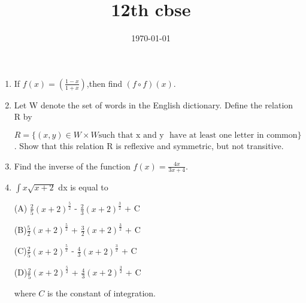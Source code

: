 \documentclass[12pt]{article}
\title{12th cbse}
\date{\today}
\begin{document}
\begin{enumerate}

\item If $f(x)=(\frac{1-x}{1+x})$,then find $(f\circ f)(x)$.

\item Let W denote the set of words in the English dictionary. Define the relation R by

$R = \{(x, y) \in W \times W \text{such that} \text{ x  and y }  \text{ have at least one letter in common}\}$.
Show that this relation R is reflexive and symmetric, but not transitive.

\item Find the inverse of the function $f(x) = \frac{4x}{3x+4}$.

\item $\int x \sqrt{x + 2}$ dx is equal to

(A) $\frac{2}{5}(x + 2)^{\frac{5}{2}}$ - $\frac{2}{3}(x + 2)^{\frac{3}{2}}$ + C

(B)$\frac{5}{2}(x + 2)^{\frac{5}{2}}$ + $\frac{3}{2}(x + 2)^{\frac{3}{2}}$ + C

(C)$\frac{2}{5}(x + 2)^{\frac{5}{2}}$ - $\frac{4}{3}(x + 2)^{\frac{3}{2}}$ + C

(D)$\frac{2}{5}(x + 2)^{\frac{5}{2}}$ + $\frac{4}{3}(x + 2)^{\frac{3}{2}}$ + C


where \(C\) is the constant of integration.
\end{enumerate}
\end{document}
